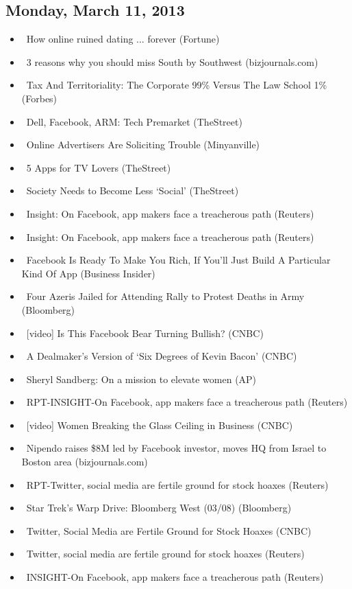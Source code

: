 \documentclass[11pt,asymmetric]{article}
\begin{document}
\subsection*{Monday, March 11, 2013}
\begin{itemize}
\item\ How online ruined dating ... forever (Fortune)
\item\ 3 reasons why you should miss South by Southwest (bizjournals.com)
\item\ Tax And Territoriality: The Corporate 99\% Versus The Law School 1\% (Forbes)
\item\ Dell, Facebook, ARM: Tech Premarket (TheStreet)
\item\ Online Advertisers Are Soliciting Trouble (Minyanville)
\item\ 5 Apps for TV Lovers (TheStreet)
\item\ Society Needs to Become Less `Social' (TheStreet)
\item\ Insight: On Facebook, app makers face a treacherous path (Reuters)
\item\ Insight: On Facebook, app makers face a treacherous path (Reuters)
\item\ Facebook Is Ready To Make You Rich, If You'll Just Build A Particular Kind Of App (Business Insider)
\item\ Four Azeris Jailed for Attending Rally to Protest Deaths in Army (Bloomberg)
\item\ [video] Is This Facebook Bear Turning Bullish? (CNBC)
\item\ A Dealmaker's Version of `Six Degrees of Kevin Bacon' (CNBC)
\item\ Sheryl Sandberg: On a mission to elevate women (AP)
\item\ RPT-INSIGHT-On Facebook, app makers face a treacherous path (Reuters)
\item\ [video] Women Breaking the Glass Ceiling in Business (CNBC)
\item\ Nipendo raises \$8M led by Facebook investor, moves HQ from Israel to Boston area (bizjournals.com)
\item\ RPT-Twitter, social media are fertile ground for stock hoaxes (Reuters)
\item\ Star Trek's Warp Drive: Bloomberg West (03/08) (Bloomberg)
\item\ Twitter, Social Media are Fertile Ground for Stock Hoaxes (CNBC)
\item\ Twitter, social media are fertile ground for stock hoaxes (Reuters)
\item\ INSIGHT-On Facebook, app makers face a treacherous path (Reuters)

\end{itemize}
\end{document}
